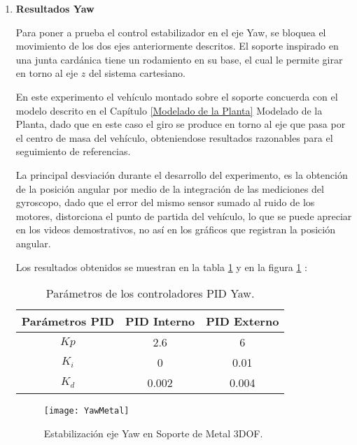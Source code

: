 \documentclass[\main/main.tex]{subfiles}
\begin{document}
\begin{enumerate}
	\item \textbf{Resultados Yaw}

	Para poner a prueba el control estabilizador en el eje Yaw, se bloquea
	el movimiento de los dos ejes anteriormente descritos. El soporte
	inspirado en una junta cardánica tiene un rodamiento en su base, el
	cual le permite girar en torno al eje $z$ del sistema cartesiano. 

	En este experimento el vehículo montado sobre el soporte concuerda
	con el modelo descrito en el Capítulo \ref{Modelado de la Planta} Modelado de la Planta, dado que en este caso el giro
	se produce en torno al eje que pasa por el centro de masa del vehículo,
	obteniendose resultados razonables para el seguimiento de referencias. 

	La principal desviación durante el desarrollo del experimento, es
	la obtención de la posición angular por medio de la integración de
	las mediciones del gyroscopo, dado que el error del mismo sensor sumado
	al ruido de los motores, distorciona el punto de partida del vehículo,
	lo que se puede apreciar en los videos demostrativos, no así en los
	gráficos que registran la posición angular.

	Los resultados obtenidos se muestran en la tabla \ref{table: Parametros Yaw Me} y en la figura \ref{fig: Resultados Yaw Me} :

	\begin{table}[H]
	\noindent \begin{centering}
	\begin{tabular}{|c|c|c|}
	\hline 
	Parámetros PID & PID Interno & PID Externo\tabularnewline
	\hline 
	\hline 
	$Kp$ & 2.6 & 6\tabularnewline
	\hline 
	$K_{i}$ & 0 & 0.01\tabularnewline
	\hline 
	$K_{d}$ & 0.002 & 0.004\tabularnewline
	\hline 
	\end{tabular}
	\par\end{centering}
	\caption{Parámetros de los controladores PID Yaw.}\label{table: Parametros Yaw Me}\noindent
	\end{table}

	\begin{figure}[H]
	\noindent \begin{centering}
	\texttt{[image: YawMetal]}
	\par\end{centering}
	\caption{Estabilización eje Yaw en Soporte de Metal 3DOF.}\label{fig: Resultados Yaw Me}\noindent
	\end{figure}


\end{enumerate}
\end{document}

